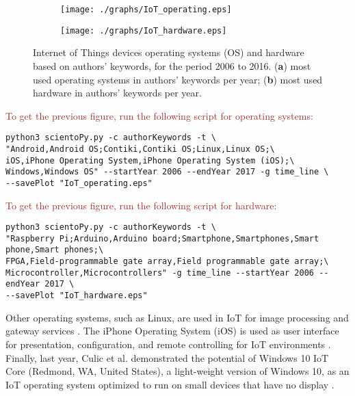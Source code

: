 \documentclass[symmetry,article,accept,moreauthors,pdftex10pt,a4paper]{mdpi}
\begin{document}
\begin{figure}[H]
	\centering
	\begin{subfigure}[b]{0.49\textwidth}
		\texttt{[image: ./graphs/IoT\_operating.eps]}
		\caption{}
		\label{fig_operating_systems}
	\end{subfigure}
	\begin{subfigure}[b]{0.49\textwidth}
		\texttt{[image: ./graphs/IoT\_hardware.eps]}
		\caption{}
		\label{fig_hardware}
	\end{subfigure}
			\vspace{-12pt}
	\caption{Internet of Things devices operating systems (OS) and hardware based on authors' keywords, for the period 2006 to 2016. (\textbf{a}) most used operating systems in authors' keywords per year; (\textbf{b}) most used hardware in authors' keywords per year.}
	\label{fig_os_hardware}
\end{figure}


\noindent
\textcolor{brown}{To get the previous figure, run the following script for operating systems:}\\
\begin{verbatim}
python3 scientoPy.py -c authorKeywords -t \
"Android,Android OS;Contiki,Contiki OS;Linux,Linux OS;\
iOS,iPhone Operating System,iPhone Operating System (iOS);\
Windows,Windows OS" --startYear 2006 --endYear 2017 -g time_line \
--savePlot "IoT_operating.eps"
\end{verbatim}

\noindent
\textcolor{brown}{To get the previous figure, run the following script for hardware:}\\
\begin{verbatim}
python3 scientoPy.py -c authorKeywords -t \
"Raspberry Pi;Arduino,Arduino board;Smartphone,Smartphones,Smart phone,Smart phones;\
FPGA,Field-programmable gate array,Field programmable gate array;\
Microcontroller,Microcontrollers" -g time_line --startYear 2006 --endYear 2017 \
--savePlot "IoT_hardware.eps"
\end{verbatim}

Other operating systems, such as Linux, are used in IoT for image processing \cite{Dinesh2016} and gateway services \cite{Xu20164713}. The iPhone Operating System (iOS) is used as user interface for presentation, configuration, and remote controlling for IoT environments \cite{Kovalcik2016}. Finally, last year, Culic et al. demonstrated the potential of Windows 10 IoT Core (Redmond, WA, United States), a light-weight version of Windows 10, as an IoT operating system optimized to run on small devices that have no display \cite{7753246}.
\end{document}
